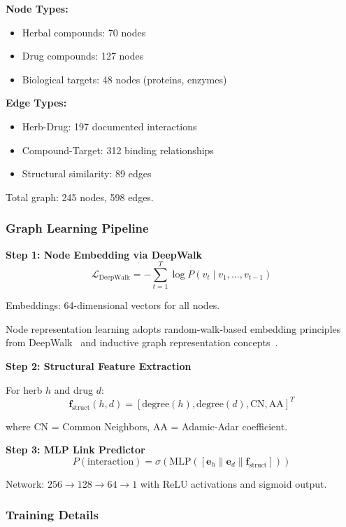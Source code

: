 \documentclass[11pt,a4paper]{article}
\begin{document}
\textbf{Node Types:}
\begin{itemize}
    \item Herbal compounds: 70 nodes
    \item Drug compounds: 127 nodes
    \item Biological targets: 48 nodes (proteins, enzymes)
\end{itemize}

\textbf{Edge Types:}
\begin{itemize}
    \item Herb-Drug: 197 documented interactions
    \item Compound-Target: 312 binding relationships
    \item Structural similarity: 89 edges
\end{itemize}

Total graph: 245 nodes, 598 edges.

\subsubsection{Graph Learning Pipeline}

\textbf{Step 1: Node Embedding via DeepWalk}
\[
\mathcal{L}_{\text{DeepWalk}} = -\sum_{t=1}^{T} \log P(v_t \mid v_1, ..., v_{t-1})
\]

Embeddings: 64-dimensional vectors for all nodes.

Node representation learning adopts random-walk-based embedding principles from DeepWalk~\cite{perozzi2014} and inductive graph representation concepts~\cite{hamilton2017}.

\textbf{Step 2: Structural Feature Extraction}

For herb $h$ and drug $d$:
\[
\mathbf{f}_{\text{struct}}(h, d) = [\text{degree}(h), \text{degree}(d), \text{CN}, \text{AA}]^T
\]

where CN = Common Neighbors, AA = Adamic-Adar coefficient.

\textbf{Step 3: MLP Link Predictor}
\[
P(\text{interaction}) = \sigma(\text{MLP}([\mathbf{e}_h \| \mathbf{e}_d \| \mathbf{f}_{\text{struct}}]))
\]

Network: $256 \to 128 \to 64 \to 1$ with ReLU activations and sigmoid output.

\subsubsection{Training Details}
\end{document}
